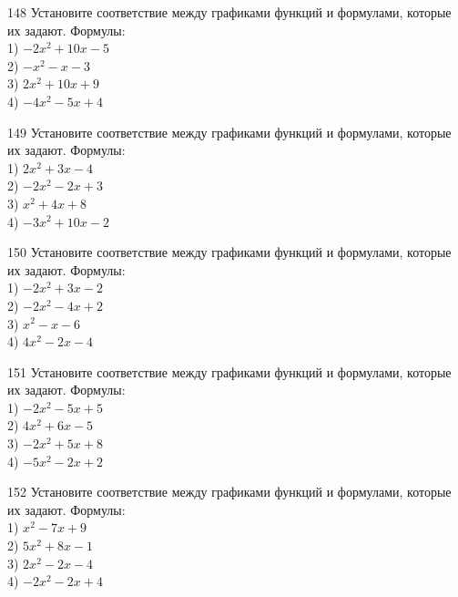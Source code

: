 \documentclass[4apaper]{article}
\begin{document}
\begin{taskBN}{148}
Установите соответствие между графиками функций и формулами, которые их задают. Формулы: \\1) $-2x^2+10x-5$\\2) $-x^2-x-3$\\3) $2x^2+10x+9$\\4) $-4x^2-5x+4$
\end{taskBN}

\begin{taskBN}{149}
Установите соответствие между графиками функций и формулами, которые их задают. Формулы: \\1) $2x^2+3x-4$\\2) $-2x^2-2x+3$\\3) $x^2+4x+8$\\4) $-3x^2+10x-2$
\end{taskBN}

\begin{taskBN}{150}
Установите соответствие между графиками функций и формулами, которые их задают. Формулы: \\1) $-2x^2+3x-2$\\2) $-2x^2-4x+2$\\3) $x^2-x-6$\\4) $4x^2-2x-4$
\end{taskBN}

\begin{taskBN}{151}
Установите соответствие между графиками функций и формулами, которые их задают. Формулы: \\1) $-2x^2-5x+5$\\2) $4x^2+6x-5$\\3) $-2x^2+5x+8$\\4) $-5x^2-2x+2$
\end{taskBN}

\begin{taskBN}{152}
Установите соответствие между графиками функций и формулами, которые их задают. Формулы: \\1) $x^2-7x+9$\\2) $5x^2+8x-1$\\3) $2x^2-2x-4$\\4) $-2x^2-2x+4$
\end{taskBN}
\end{document}
